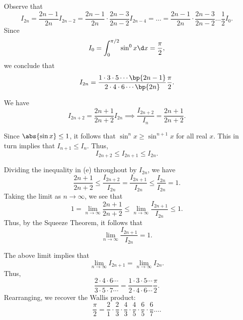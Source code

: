 \begin{solution}
\begin{ppart}
    \end{ppart}
    \begin{ppart}
        Observe that \[I_{2n} = \frac{2n-1}{2n} I_{2n-2} = \frac{2n-1}{2n} \cdot \frac{2n-3}{2n-2} I_{2n-4} = \dots = \frac{2n-1}{2n} \cdot \frac{2n-3}{2n-2} \dots \frac{1}{2} I_0.\] Since \[I_0 = \int_0^{\pi/2} \sin^0 x \d x = \frac{\pi}{2},\] we conclude that \[I_{2n} = \frac{1 \cdot 3 \cdot 5 \cdots \bp{2n-1}}{2 \cdot 4 \cdot 6 \cdots \bp{2n}} \frac\pi2.\]
    \end{ppart}
    \begin{ppart}
        We have \[I_{2n+2} = \frac{2n+1}{2n+2} I_{2n} \implies \frac{I_{2n+2}}{I_n} = \frac{2n+1}{2n+2}.\]
    \end{ppart}
    \begin{ppart}
        Since $\abs{\sin x} \leq 1$, it follows that $\sin^n x \geq \sin^{n+1} x$ for all real $x$. This in turn implies that $I_{n+1} \leq I_{n}$. Thus, \[I_{2n+2} \leq I_{2n+1} \leq I_{2n}.\]
    \end{ppart}
    \begin{ppart}
        Dividing the inequality in (e) throughout by $I_{2n}$, we have \[\frac{2n+1}{2n+2} \leq \frac{I_{2n+2}}{I_{2n}} = \frac{I_{2n+1}}{I_{2n}} \leq \frac{I_{2n}}{I_{2n}} = 1.\] Taking the limit as $n \to \infty$, we see that \[1 = \lim_{n \to \infty} \frac{2n+1}{2n+2} \leq \lim_{n \to \infty} \frac{I_{2n+1}}{I_{2n}} \leq 1.\] Thus, by the Squeeze Theorem, it follows that \[\lim_{n \to \infty} \frac{I_{2n+1}}{I_{2n}} = 1.\]
    \end{ppart}
    \begin{ppart}
        The above limit implies that \[\lim_{n \to \infty} I_{2n+1} = \lim_{n \to \infty} I_{2n}.\] Thus, \[\frac{2 \cdot 4 \cdot 6 \cdots}{3 \cdot 5 \cdot 7 \cdots} = \frac{1 \cdot 3 \cdot 5 \cdots}{2 \cdot 4 \cdot 6 \cdots} \frac\pi2.\] Rearranging, we recover the Wallis product: \[\frac\pi2 = \frac21 \cdot \frac23 \cdot \frac43 \cdot \frac45 \cdot \frac65 \cdot \frac67 \dots.\]
    \end{ppart}
\end{solution}

